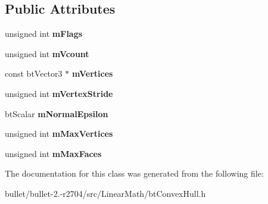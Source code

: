 \subsection*{Public Attributes}
\begin{DoxyCompactItemize}
\item 
\hypertarget{class_hull_desc_a458cec3f34166dbd6e562534deea8eac}{unsigned int {\bfseries m\+Flags}}\label{class_hull_desc_a458cec3f34166dbd6e562534deea8eac}

\item 
\hypertarget{class_hull_desc_a294c0dcc9354d0aa20392465d81c2eb1}{unsigned int {\bfseries m\+Vcount}}\label{class_hull_desc_a294c0dcc9354d0aa20392465d81c2eb1}

\item 
\hypertarget{class_hull_desc_adf157f8ee315b28931caec03c0642746}{const bt\+Vector3 $\ast$ {\bfseries m\+Vertices}}\label{class_hull_desc_adf157f8ee315b28931caec03c0642746}

\item 
\hypertarget{class_hull_desc_aebbaaec73828a2b1359a27dbff250070}{unsigned int {\bfseries m\+Vertex\+Stride}}\label{class_hull_desc_aebbaaec73828a2b1359a27dbff250070}

\item 
\hypertarget{class_hull_desc_a7175db2341ffca96416cc9da630b86d4}{bt\+Scalar {\bfseries m\+Normal\+Epsilon}}\label{class_hull_desc_a7175db2341ffca96416cc9da630b86d4}

\item 
\hypertarget{class_hull_desc_ad9c7a335bb50c3025dc9e40c3924dd53}{unsigned int {\bfseries m\+Max\+Vertices}}\label{class_hull_desc_ad9c7a335bb50c3025dc9e40c3924dd53}

\item 
\hypertarget{class_hull_desc_a72b66029f0d6a27e691ecb8d3bedf205}{unsigned int {\bfseries m\+Max\+Faces}}\label{class_hull_desc_a72b66029f0d6a27e691ecb8d3bedf205}

\end{DoxyCompactItemize}


The documentation for this class was generated from the following file\+:\begin{DoxyCompactItemize}
\item 
bullet/bullet-\/2.-\/r2704/src/\+Linear\+Math/bt\+Convex\+Hull.\+h\end{DoxyCompactItemize}
